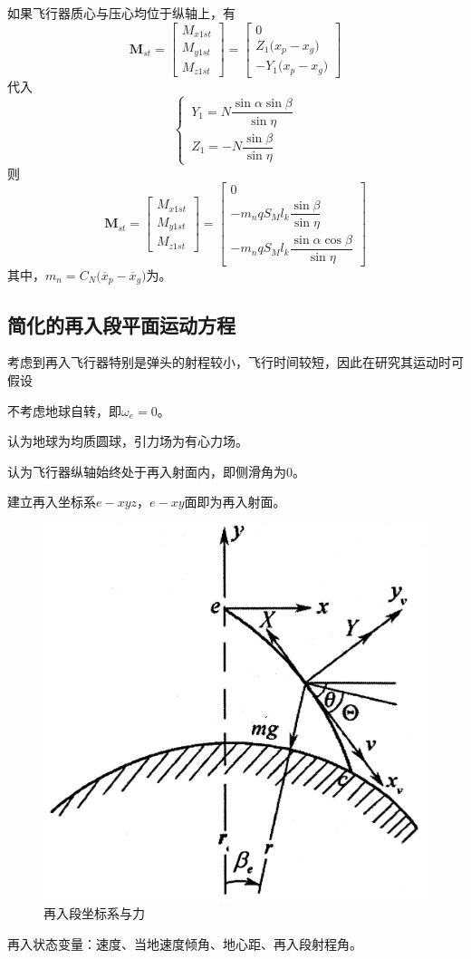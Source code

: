 如果飞行器质心与压心均位于纵轴上，有
\begin{equation}
	\bm{M}_{st} = 
	\begin{bmatrix}
		M_{x1st}\\
		M_{y1st}\\
		M_{z1st}
	\end{bmatrix}
	=
	\begin{bmatrix}
		0 \\
		Z_1\big(x_p - x_g\big) \\
		-Y_1 \big(x_p - x_g\big)
	\end{bmatrix}
\end{equation}
代入
\begin{equation*}
	\begin{cases}
		\, Y_1 = N\dfrac{\sin \alpha \sin \beta}{\sin \eta}\\[0.8em]
		\, Z_1 = - N \dfrac{\sin \beta}{\sin \eta}
	\end{cases}
\end{equation*}
则
\begin{equation}
	\bm{M}_{st} = 
	\begin{bmatrix}
		M_{x1st}\\
		M_{y1st}\\
		M_{z1st}
	\end{bmatrix}
	=
	\begin{bmatrix}
		0 \\
		- m_n q S_M l_k \dfrac{\sin \beta}{\sin \eta} \\[0.8em]
		- m_n q S_M l_k \dfrac{\sin \alpha \cos \beta}{\sin \eta}
	\end{bmatrix}
\end{equation}
其中，$m_n = C_N \big(\overline{x}_p - \overline{x}_g\big)$为。


\subsection{简化的再入段平面运动方程}

考虑到再入飞行器特别是弹头的射程较小，飞行时间较短，因此在研究其运动时可假设

\noa[1] 不考虑地球自转，即$\omega_e = 0$。

\noa[2] 认为地球为均质圆球，引力场为有心力场。

\noa[3] 认为飞行器纵轴始终处于再入射面内，即侧滑角为0。

建立再入坐标系$e-xyz$，$e-xy$面即为再入射面。

\begin{figure}[!htb]
	\centering
	\includegraphics[width=0.3\linewidth]{pic/再入段坐标系与力.jpg}
	\caption{再入段坐标系与力}
\end{figure}
再入状态变量：速度、当地速度倾角、地心距、再入段射程角。

